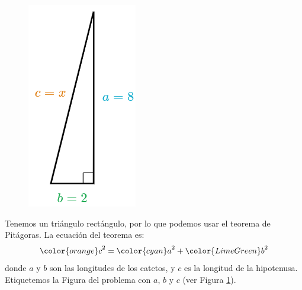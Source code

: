 \begin{minipage}[t][][t]{0.65\textwidth}
    \begin{solutionbox}{9.5cm}
        \begin{minipage}{0.3\textwidth}
            \begin{figure}[H]
                \centering
                \includegraphics[width=0.7\linewidth]{../images/lados_pitagoras_17a.png}
                \caption{}
                \label{fig:lados_pitagoras_17a}
            \end{figure}
        \end{minipage}\hfill
        \begin{minipage}{0.65\textwidth}
            Tenemos un triángulo rectángulo, por lo que podemos usar el teorema de Pitágoras.
            La ecuación del teorema es:
            \[{\color{orange}c}^2={\color{cyan}a}^2+{\color{LimeGreen}b}^2\]
            donde $a$ y $b$ son las longitudes de los catetos, y $c$ es la longitud de la hipotenusa.
            Etiquetemos la Figura del problema con $a$, $b$ y $c$ (ver Figura \ref{fig:lados_pitagoras_17a}).

\end{minipage}
\end{solutionbox}
\end{minipage}
